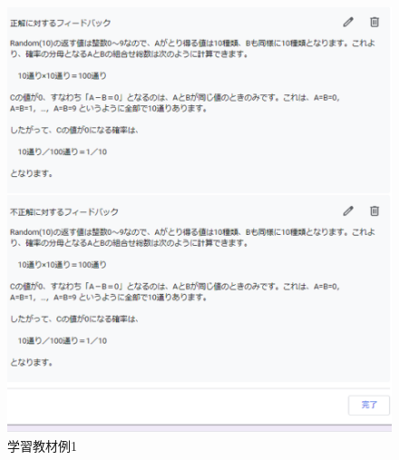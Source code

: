 \begin{figure}[htbp]
\begin{center}
\includegraphics[width=16cm]{img/kyozai1.eps}
\end{center}
\caption{学習教材例1}
\label{fig:kyozai1}
\end{figure}

